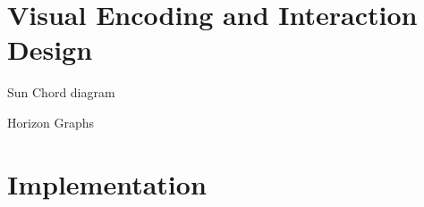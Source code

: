 \documentclass{vgtc}                          %
\begin{document}
\cite{sorger2019immersive}

\cite{Waldner2020InteractiveEO}

\cite{unger2020interactive}





























\section{Visual Encoding and Interaction Design} %

Sun Chord diagram

Horizon Graphs


\section{Implementation} %

\end{document}
